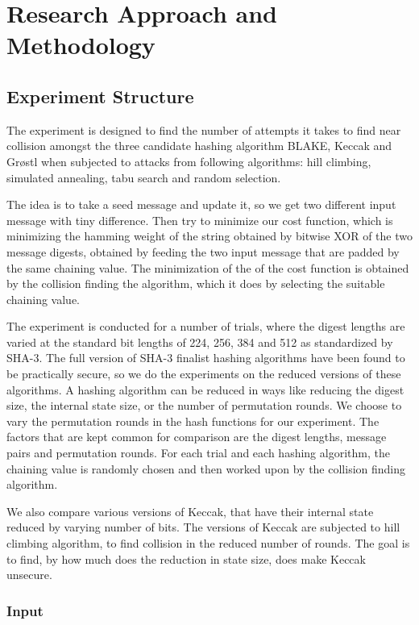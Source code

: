 \chapter{Research Approach and Methodology}

\section{Experiment Structure}

The experiment is designed to find the number of attempts it takes to find near collision amongst the three
candidate hashing algorithm BLAKE, Keccak and Gr{\o}stl when subjected to attacks from following algorithms:
hill climbing, simulated annealing, tabu search and random selection. 

The idea is to take a seed message and update it, so we get two different input message with tiny difference. 
Then try to minimize our cost function, which is minimizing the hamming weight of the string obtained by bitwise
XOR of the two message digests, obtained by feeding the two input message that are padded by the same chaining 
value. The minimization of the of the cost function is obtained by the collision finding the algorithm, which 
it does by selecting the suitable chaining value.

The experiment is conducted for a number of trials, where the digest lengths are varied at the standard bit
lengths of 224, 256, 384 and 512 as standardized by SHA-3. The full version of SHA-3 finalist hashing algorithms
have been found to be practically secure, so we do the experiments on the reduced versions of these algorithms.
A hashing algorithm can be reduced in ways like reducing the digest size, the internal state size, or the
number of permutation rounds. We choose to vary the permutation rounds in the hash functions for our experiment.
The factors that are kept common for comparison are the digest lengths, message pairs and permutation rounds.
For each trial and each hashing algorithm, the chaining value is randomly chosen and then worked upon by
the collision finding algorithm.

We also compare various versions of Keccak, that have their internal state reduced by varying number of bits. 
The versions of Keccak are subjected to hill climbing algorithm, to find collision in the reduced number of
rounds. The goal is to find, by how much does the reduction in state size, does make Keccak unsecure.

\subsection{Input}


